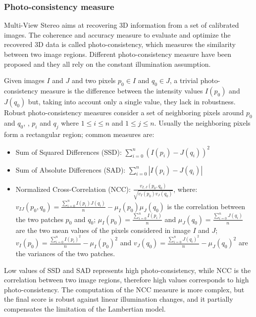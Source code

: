 \subsubsection{Photo-consistency measure}
Multi-View Stereo aims at recovering 3D information from a set of calibrated images. The coherence and accuracy measure to evaluate and optimize the recovered 3D data is called photo-consistency, which measures the similarity between two image regions.
Different photo-consistency measure have been proposed and they all rely on the constant illumination assumption. 

Given images $I$ and $J$ and two pixels $p_0\in I$ and $q_0\in J$, a trivial photo-consistency measure is the difference between the intensity values  $I(p_0)$ and $J(q_0)$ but, taking into account only a single value, they lack in robustness. 
Robust photo-consistency measures consider a set of neighboring  pixels around $p_0$ and $q_0$, \ie, $p_i$ and $q_j$ where $1\leq i \leq n$ and $1\leq j \leq n$. Usually the neighboring pixels form a rectangular region; common measures are:
\begin{itemize}
  \item Sum of Squared Differences (SSD): $\sum_{i=0}^{n}(I(p_i) - J(q_i))^2$
  \item Sum of Absolute Differences (SAD): $\sum_{i=0}^{n}|I(p_i) - J(q_i)|$
  \item Normalized Cross-Correlation (NCC): $\frac{v_{I,J}(p_0,q_0)}{\sqrt{v_{I}(p_0) v_{J}(q_0)}}$,
  where:
   $v_{IJ}(p_0,q_0) = \frac{\sum_{i=0}^{n}I(p_i)J(q_i)}{n} - \mu_I(p_0) \mu_{J}(q_0)$ is the correlation between the two patches $p_0$ and $q_0$;
     $\mu_{I}(p_0) = \frac{\sum_{i=0}^{n}I(p_i)}{n}$ and $\mu_{J}(q_0) = \frac{\sum_{i=0}^{n}J(q_i)}{n}$ are the two mean values of the pixels considered in image $I$ and $J$;
     $v_{I}(p_0) = \frac{\sum_{i=0}^{n}I(p_i)^2}{n} - \mu_I(p_0)^2$ and $v_{J}(q_0) = \frac{\sum_{i=0}^{n}J(q_i)^2}{n} - \mu_{J}(q_0)^2$ are the variances of the two patches.
    
\end{itemize}

Low values of SSD and SAD represents high photo-consistency, while NCC is the correlation between two image regions, therefore high values corresponds to high photo-consistency. 
The computation of the NCC measure is more complex, but the final score is robust against linear illumination changes, and it partially compensates the limitation of the Lambertian model.


